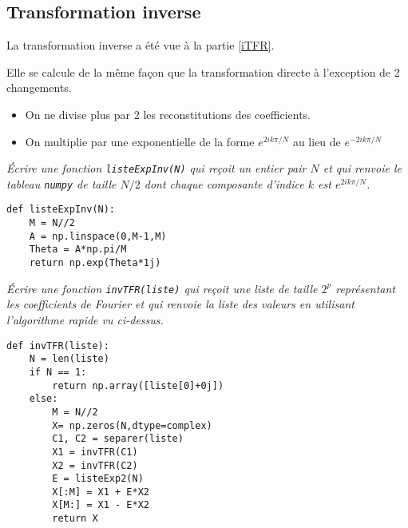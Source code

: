 \newpage
\subsection{Transformation inverse}
La transformation inverse a été vue à la partie \ref{iTFR}. 

Elle se calcule de la même façon que la transformation directe à l'exception de 2 changements.
\begin{itemize}
 \item On ne divise plus par 2 les reconstitutions des coefficients.
 \item On multiplie par une exponentielle de la forme $e^{2ik\pi/N}$ au lieu de $e^{-2ik\pi/N}$ 
\end{itemize}
\begin{Exercise}\it Écrire une fonction {\tt listeExpInv(N)} qui reçoit un entier pair $N$ et qui renvoie le tableau 
{\tt numpy} de taille $N/2$ dont chaque composante d'indice $k$ est $e^{2ik\pi/N}$.
\end{Exercise}
\begin{Answer}
\begin{lstlisting}
def listeExpInv(N):
    M = N//2
    A = np.linspace(0,M-1,M)
    Theta = A*np.pi/M
    return np.exp(Theta*1j)
\end{lstlisting}
\end{Answer}
\begin{Exercise}\it 
Écrire une fonction {\tt invTFR(liste)} qui reçoit une liste de taille $2^p$ représentant les 
coefficients de Fourier et qui renvoie la liste des valeurs en utilisant l'algorithme rapide vu ci-dessus.
\end{Exercise}
\begin{Answer}
\begin{lstlisting}
def invTFR(liste):
    N = len(liste)
    if N == 1:
        return np.array([liste[0]+0j])
    else:
        M = N//2
        X= np.zeros(N,dtype=complex)
        C1, C2 = separer(liste)
        X1 = invTFR(C1)
        X2 = invTFR(C2)
        E = listeExp2(N)
        X[:M] = X1 + E*X2
        X[M:] = X1 - E*X2
        return X
\end{lstlisting}
\newpage
\end{Answer}

